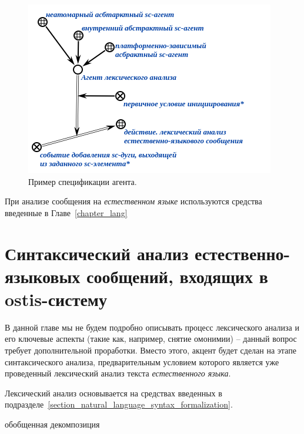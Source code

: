 \begin{figure}[h]
    \centering
    \includegraphics[scale=0.8]{images/part4/chapter_nl_interfaces/agent_spec}
    \caption{Пример спецификации агента.}
    \label{fig:agent_spec}
\end{figure}

При анализе сообщения на \textit{естественном языке} используются средства введенные в Главе~\ref{chapter_lang}

\section{Синтаксический анализ естественно-языковых сообщений, входящих в ostis-систему}
\label{section_natural_language_messages_lexical_analysis}

В данной главе мы не будем подробно описывать процесс лексического анализа и его ключевые аспекты (такие как, например, снятие омонимии) – данный вопрос требует дополнительной проработки. Вместо этого, акцент будет сделан на этапе синтаксического анализа, предварительным условием которого является уже проведенный лексический анализ текста \textit{естественного языка}.

Лексический анализ основывается на средствах введенных в подразделе~\ref{section_natural_language_syntax_formalization}.

\begin{SCn}

    \begin{scnrelfromset}{обобщенная декомпозиция}
    \end{scnrelfromset}

\end{SCn}

